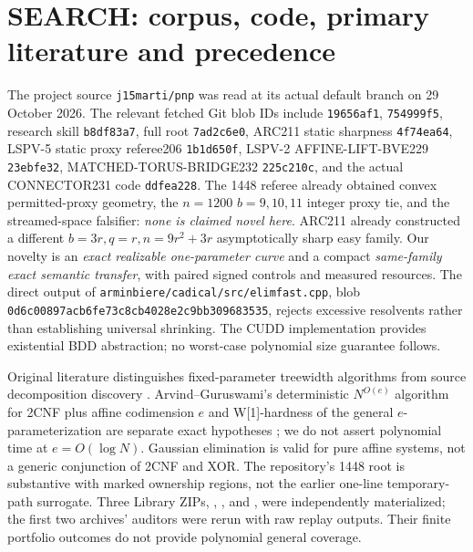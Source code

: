 \documentclass[10pt]{article}
\begin{document}
\section{SEARCH: corpus, code, primary literature and precedence}
The project source \texttt{j15marti/pnp} was read at its actual default branch on 29 October 2026. The relevant fetched Git blob IDs include  \texttt{19656af1},  \texttt{754999f5}, research skill \texttt{b8df83a7}, full root  \texttt{7ad2c6e0}, ARC211 static sharpness \texttt{4f74ea64}, LSPV-5 static proxy referee206 \texttt{1b1d650f}, LSPV-2 AFFINE-LIFT-BVE229 \texttt{23ebfe32}, MATCHED-TORUS-BRIDGE232 \texttt{225c210c}, and the actual CONNECTOR231 code \texttt{ddfea228}. The 1448 referee already obtained convex permitted-proxy geometry, the $n=1200$ $b=9,10,11$ integer proxy tie, and the streamed-space falsifier: \emph{none is claimed novel here}. ARC211 already constructed a different $b=3r,q=r,n=9r^2+3r$ asymptotically sharp easy family. Our novelty is an \emph{exact realizable one-parameter curve} and a compact \emph{same-family exact semantic transfer}, with paired signed controls and measured resources. The direct output of \texttt{arminbiere/cadical/src/elimfast.cpp}, blob \texttt{0d6c00897acb6fe73c8cb4028e2c9bb309683535}, rejects excessive resolvents rather than establishing universal shrinking. The CUDD implementation  provides existential BDD abstraction; no worst-case polynomial size guarantee follows.

Original literature distinguishes fixed-parameter treewidth algorithms from source decomposition discovery \cite{samer}. Arvind--Guruswami's deterministic $N^{O(e)}$ algorithm for 2CNF plus affine codimension $e$ and W[1]-hardness of the general $e$-parameterization are separate exact hypotheses \cite{ag}; we do not assert polynomial time at $e=O(\log N)$. Gaussian elimination is valid for pure affine systems, not a generic conjunction of 2CNF and XOR. The repository's 1448 root is substantive with marked ownership regions, not the earlier one-line temporary-path surrogate. Three Library ZIPs, , , and , were independently materialized; the first two archives' auditors were rerun with raw replay outputs. Their finite portfolio outcomes do not provide polynomial general coverage.
\end{document}
